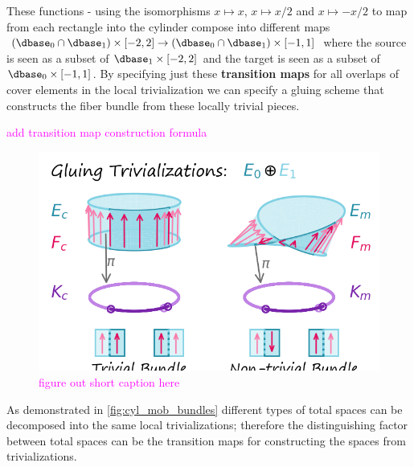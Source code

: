\documentclass[journal]{IEEEtran}
\newcommand{\note}[1]{\textcolor{magenta}{#1}}
\theoremstyle{definition}
\theoremstyle{remark}
\begin{document}
These functions - using the isomorphisms $x\mapsto x$, $x\mapsto x/2$ and $x\mapsto -x/2$ to map from each rectangle into the cylinder compose into different maps $(\dbase_0\cap\dbase_1)\times[-2,2]\to(\dbase_0\cap\dbase_1)\times[-1,1]$ where the source is seen as a subset of $\dbase_1\times[-2,2]$ and the target is seen as a subset of $\dbase_0\times[-1,1]$. By specifying just these \textbf{transition maps} for all overlaps of cover elements in the local trivialization we can specify a gluing scheme that constructs the fiber bundle from these locally trivial pieces.


\note{add transition map construction formula}

\begin{figure}[H]
  \includegraphics[width=1\columnwidth]{figures/cyl_mob.png}
  \caption{\note{figure out short caption here}\label{fig:cyl_mob_bundles}}
\end{figure}
As demonstrated in \autoref{fig:cyl_mob_bundles} different types of total spaces can be decomposed into the same local trivializations; therefore the distinguishing factor between total spaces can be the transition maps for constructing the spaces from trivializations.
\end{document}
